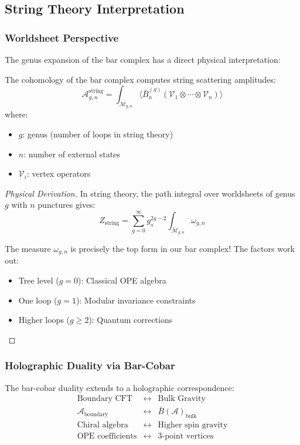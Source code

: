 \subsection{String Theory Interpretation}

\subsubsection{Worldsheet Perspective}

The genus expansion of the bar complex has a direct physical interpretation:

\begin{theorem}
The cohomology of the bar complex computes string scattering amplitudes:
\[
\mathcal{A}_{g,n}^{\text{string}} = \int_{\overline{\mathcal{M}}_{g,n}} \langle \bar{B}^{(g)}_n(\mathcal{V}_1 \otimes \cdots \otimes \mathcal{V}_n) \rangle
\]
where:
\begin{itemize}
\item $g$: genus (number of loops in string theory)
\item $n$: number of external states
\item $\mathcal{V}_i$: vertex operators
\end{itemize}
\end{theorem}

\begin{proof}[Physical Derivation]
In string theory, the path integral over worldsheets of genus $g$ with $n$ punctures gives:
\[
Z_{\text{string}} = \sum_{g=0}^\infty g_s^{2g-2} \int_{\overline{\mathcal{M}}_{g,n}} \omega_{g,n}
\]

The measure $\omega_{g,n}$ is precisely the top form in our bar complex! The factors work out:
\begin{itemize}
\item Tree level ($g=0$): Classical OPE algebra
\item One loop ($g=1$): Modular invariance constraints
\item Higher loops ($g \geq 2$): Quantum corrections
\end{itemize}
\end{proof}

\subsubsection{Holographic Duality via Bar-Cobar}

\begin{theorem}
The bar-cobar duality extends to a holographic correspondence:
\[
\begin{array}{ccc}
\text{Boundary CFT} & \leftrightarrow & \text{Bulk Gravity} \\
\mathcal{A}_{\text{boundary}} & \leftrightarrow & \bar{B}(\mathcal{A})_{\text{bulk}} \\
\text{Chiral algebra} & \leftrightarrow & \text{Higher spin gravity} \\
\text{OPE coefficients} & \leftrightarrow & \text{3-point vertices}
\end{array}
\]
\end{theorem}

